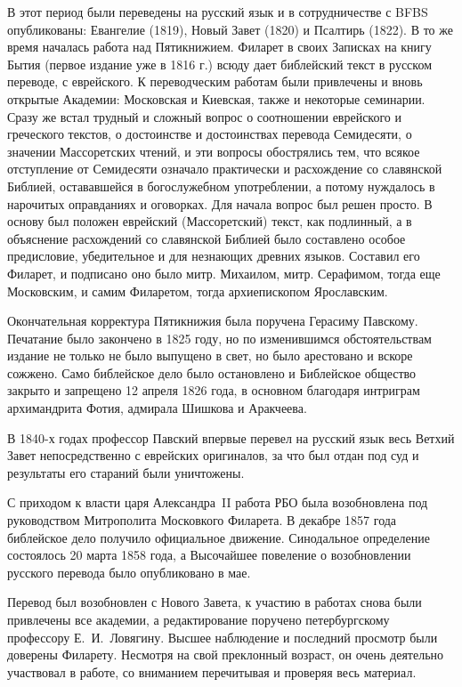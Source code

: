 В этот период были переведены на русский язык и в сотрудничестве с BFBS
опубликованы: Евангелие (1819), Новый Завет (1820) и Псалтирь (1822).
В то же время началась работа над Пятикнижием.
Филарет в своих Записках на книгу Бытия (первое издание уже в 1816 г.)
всюду дает библейский текст в русском переводе, с еврейского.
К переводческим работам были привлечены и вновь открытые Академии:
Московская и Киевская, также и некоторые семинарии.
Сразу же встал трудный и сложный вопрос о соотношении еврейского и
греческого текстов, о достоинстве и достоинствах перевода Семидесяти, о
значении Массоретских чтений, и эти вопросы обострялись тем, что
всякое отступление от Семидесяти означало практически и расхождение
со славянской Библией, остававшейся в богослужебном употреблении,
а потому нуждалось в нарочитых оправданиях и оговорках.
Для начала вопрос был решен просто.
В основу был положен еврейский (Массоретский) текст, как подлинный,
а в объяснение расхождений со славянской Библией было составлено
особое предисловие, убедительное и для незнающих древних языков.
Составил его Филарет, и подписано оно было митр. Михаилом, митр.
Серафимом, тогда еще Московским, и самим Филаретом, тогда
архиепископом Ярославским.

Окончательная корректура Пятикнижия была поручена Герасиму Павскому.
Печатание было закончено в 1825 году, но по изменившимся
обстоятельствам  издание не только не было выпущено в свет, но было
арестовано и вскоре сожжено.
Само библейское дело было остановлено и Библейское общество закрыто
и запрещено 12 апреля 1826 года, в основном благодаря интриграм архимандрита
Фотия, адмирала Шишкова и Аракчеева.

В 1840-х годах профессор Павский впервые перевел на русский язык весь
Ветхий Завет непосредственно с еврейских оригиналов, за что был отдан
под суд и результаты его стараний были уничтожены.

С приходом к власти царя Александра~II работа РБО была возобновлена
под руководством Митрополита Московкого Филарета.
В декабре 1857 года библейское дело получило официальное движение.
Синодальное определение состоялось 20 марта 1858 года, а Высочайшее
повеление о возобновлении русского перевода было опубликовано в мае.

Перевод был возобновлен с Нового Завета, к участию в работах снова были
привлечены все академии, а редактирование поручено петербургскому
профессору Е.~И.~Ловягину.
Высшее наблюдение и последний просмотр были доверены Филарету.
Несмотря на свой преклонный возраст, он очень деятельно участвовал в
работе, со вниманием перечитывая и проверяя весь материал.

